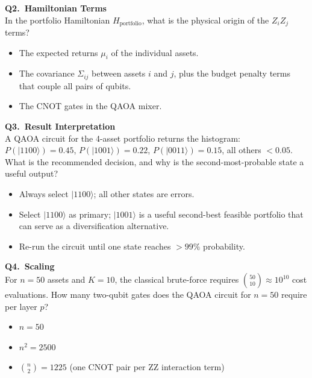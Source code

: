 \documentclass[a4paper,11pt]{article}
\newcommand{\ket}[1]{|#1\rangle}
\begin{document}
\vspace{0.3cm}
\textbf{Q2.\ Hamiltonian Terms}\\
In the portfolio Hamiltonian $H_\text{portfolio}$, what is the physical
origin of the $Z_iZ_j$ terms?
\begin{itemize}
    \item[A)] The expected returns $\mu_i$ of the individual assets.
    \item[B)] The covariance $\Sigma_{ij}$ between assets $i$ and $j$,
              plus the budget penalty terms that couple all pairs of qubits.
    \item[C)] The CNOT gates in the QAOA mixer.
\end{itemize}

\vspace{0.3cm}
\textbf{Q3.\ Result Interpretation}\\
A QAOA circuit for the 4-asset portfolio returns the histogram:
$P(\ket{1100})=0.45$, $P(\ket{1001})=0.22$, $P(\ket{0011})=0.15$,
all others $< 0.05$. What is the recommended decision, and why is the
second-most-probable state a useful output?
\begin{itemize}
    \item[A)] Always select $\ket{1100}$; all other states are errors.
    \item[B)] Select $\ket{1100}$ as primary; $\ket{1001}$ is a useful
              second-best feasible portfolio that can serve as a
              diversification alternative.
    \item[C)] Re-run the circuit until one state reaches $>99\%$ probability.
\end{itemize}

\vspace{0.3cm}
\textbf{Q4.\ Scaling}\\
For $n=50$ assets and $K=10$, the classical brute-force requires
$\binom{50}{10} \approx 10^{10}$ cost evaluations. How many two-qubit
gates does the QAOA circuit for $n=50$ require per layer $p$?
\begin{itemize}
    \item[A)] $n = 50$
    \item[B)] $n^2 = 2500$
    \item[C)] $\binom{n}{2} = 1225$ (one CNOT pair per ZZ interaction term)
\end{itemize}
\end{document}
